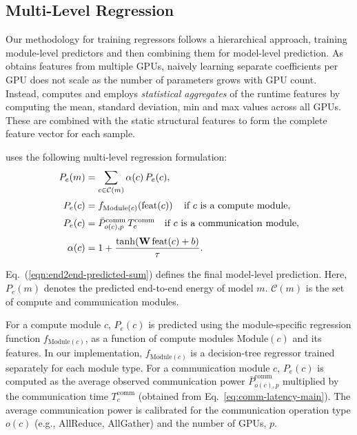 \subsection{Multi-Level Regression}
\label{ss:design-prediction}
Our methodology for training regressors follows a hierarchical approach, training module-level predictors and then combining them for model-level prediction. 
As \sys{} obtains features from multiple GPUs, naively learning separate coefficients per GPU does not scale as the number of parameters grows with GPU count.
Instead, \sys{} computes and employs \emph{statistical aggregates} of the runtime features by computing the mean, standard deviation, min and max values across all GPUs. 
These are combined with the static structural features to form the complete feature vector for each sample.

\sys{} uses the following multi-level regression formulation: 
\vspace{-6pt}
\begin{equation}
\begin{aligned}
P_e(m) &=
\sum_{c \in \mathcal{C}(m)} \alpha(c)\,P_e(c),\\[2pt]
P_e(c) &=
f_{\mathrm{Module}(c)}\!\left(\mathrm{feat}(c)\right)
\quad \text{if } c \text{ is a compute module},\\[2pt]
P_e(c) &=
\bar{P}^{\mathrm{comm}}_{o(c),p}\,
T_{c}^{\mathrm{comm}}
\quad \text{if } c \text{ is a communication module},\\[3pt]
\alpha(c) &=
1 + \frac{\tanh(\mathbf{W}\,\mathrm{feat}(c)+b)}{\tau}.
\end{aligned}
\label{eqn:end2end-predicted-sum}
\vspace{-7pt}
\end{equation}

Eq.~(\ref{eqn:end2end-predicted-sum}) defines the final model-level prediction. 
Here, $P_e(m)$ denotes the predicted end-to-end energy of model $m$. 
$\mathcal{C}(m)$ is the set of compute and communication modules.

For a compute module $c$, $P_e(c)$ is predicted using the module-specific regression function $f_{\mathrm{Module}(c)}$, as a function of compute modules $\mathrm{Module}(c)$ and its features.
In our implementation, $f_{\mathrm{Module}(c)}$ is a decision-tree regressor trained separately for each module type.
For a communication module $c$, $P_e(c)$ is computed as the average observed communication power $\bar{P}^{\mathrm{comm}}_{o(c),p}$ multiplied by the communication time $T_{c}^{\mathrm{comm}}$ (obtained from Eq.~\eqref{eq:comm-latency-main}).
The average communication power is calibrated for the communication operation type $o(c)$ (e.g., AllReduce, AllGather) and the number of GPUs, $p$. 

